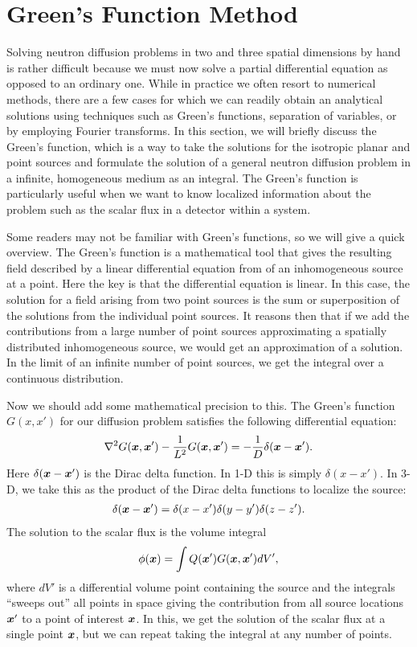 \section{Green's Function Method}

Solving neutron diffusion problems in two and three spatial dimensions by hand is rather difficult because we must now solve a partial differential equation as opposed to an ordinary one. While in practice we often resort to numerical methods, there are a few cases for which we can readily obtain an analytical solutions using techniques such as Green's functions, separation of variables, or by employing Fourier transforms. In this section, we will briefly discuss the Green's function, which is a way to take the solutions for the isotropic planar and point sources and formulate the solution of a general neutron diffusion problem in a infinite, homogeneous medium as an integral. The Green's function is particularly useful when we want to know localized information about the problem such as the scalar flux in a detector within a system.

Some readers may not be familiar with Green's functions, so we will give a quick overview. The Green's function is a mathematical tool that gives the resulting field described by a linear differential equation from of an inhomogeneous source at a point. Here the key is that the differential equation is linear. In this case, the solution for a field arising from two point sources is the sum or superposition of the solutions from the individual point sources. It reasons then that if we add the contributions from a large number of point sources approximating a spatially distributed inhomogeneous source, we would get an approximation of a solution. In the limit of an infinite number of point sources, we get the integral over a continuous distribution.

Now we should add some mathematical precision to this. The Green's function $G(x,x')$ for our diffusion problem satisfies the following differential equation:
\begin{align}
  \nabla^2 G(\bm{x},\bm{x}') - \frac{1}{L^2} G(\bm{x},\bm{x}') = -\frac{1}{D} \delta(\bm{x} - \bm{x}') .
\end{align}
Here $\delta(\bm{x} - \bm{x}')$ is the Dirac delta function. In 1-D this is simply $\delta(x - x')$. In 3-D, we take this as the product of the Dirac delta functions to localize the source:
\begin{align}
   \delta(\bm{x} - \bm{x}') = \delta( x - x' ) \delta( y - y' ) \delta( z - z' ).
\end{align}
The solution to the scalar flux is the volume integral
\begin{align}
  \phi(\bm{x}) = \int Q(\bm{x}') G(\bm{x},\bm{x}') dV',
\end{align}
where $dV'$ is a differential volume point containing the source and the integrals ``sweeps out'' all points in space giving the contribution from all source locations $\bm{x}'$ to a point of interest $\bm{x}$. In this, we get the solution of the scalar flux at a single point $\bm{x}$, but we can repeat taking the integral at any number of points. 

